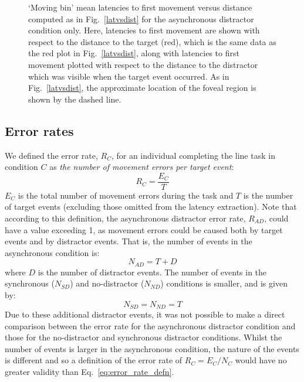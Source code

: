 \documentclass[10pt,letterpaper]{article}
\begin{document}
\begin{figure}[htb!]
\centering
\caption[Mean latencies vs. distance] {`Moving bin' mean latencies to
  first movement versus distance computed as in Fig.~\ref{latvsdist}
  for the asynchronous distractor condition only. Here, latencies to
  first movement are shown with respect to the distance to the target
  (red), which is the same data as the red plot in
  Fig.~\ref{latvsdist}, along with latencies to first movement plotted
  with respect to the distance to the distractor which was visible
  when the target event occurred. As in Fig.~\ref{latvsdist}, the
  approximate location of the foveal region is shown by the dashed
  line.}
\label{latvslastdist}
\end{figure}


\subsection*{Error rates}

We defined the error rate, $R_{C}$, for an individual completing
the line task in condition $C$ as \emph{the number of movement errors
  per target event}:
%
\begin{equation}\label{eq:error_rate_defn}
R_{C} = \frac{E_{C}}{T}
\end{equation}
%
$E_{C}$ is the total number of movement errors during the task
and $T$ is the number of target events (excluding those
omitted from the latency extraction).
%
Note that according to this definition, the asynchronous distractor
error rate, $R_{AD}$, could have a value exceeding 1, as movement
errors could be caused both by target events and by distractor
events. That is, the number of events in the asynchronous condition is:
%
\begin{equation}\label{eq:num_events_async}
N_{AD} = T + D
\end{equation}
%
where $D$ is the number of distractor events. The number of events in
the synchronous ($N_{SD}$) and no-distractor ($N_{ND}$) conditions is
smaller, and is given by:
%
\begin{equation}\label{eq:num_events_sync}
N_{SD} = N_{ND} = T
\end{equation}
%
Due to these additional distractor events, it was not possible to make
a direct comparison between the error rate for the asynchronous
distractor condition and those for the no-distractor and synchronous
distractor conditions. Whilst the number of events is larger in the
asynchronous condition, the nature of the events is different and so a
definition of the error rate of $R_{C} = {E_C}/{N_C}$ would have
no greater validity than Eq.~\ref{eq:error_rate_defn}.
\end{document}
